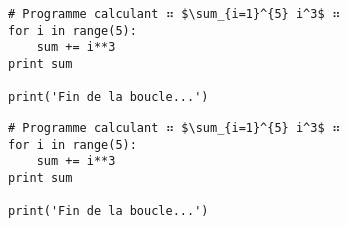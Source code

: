 \documentclass{article}
\begin{document}
\lstset{escapechar=\⠶}  %

\begin{lstlisting}
# Programme calculant ⠶ $\sum_{i=1}^{5} i^3$ ⠶
for i in range(5):
	sum += i**3
print sum

print('Fin de la boucle...')
\end{lstlisting}



\begin{lstlisting}
# Programme calculant ⠶ $\sum_{i=1}^{5} i^3$ ⠶
for i in range(5):
	sum += i**3
print sum

print('Fin de la boucle...')
\end{lstlisting}
\end{document}

